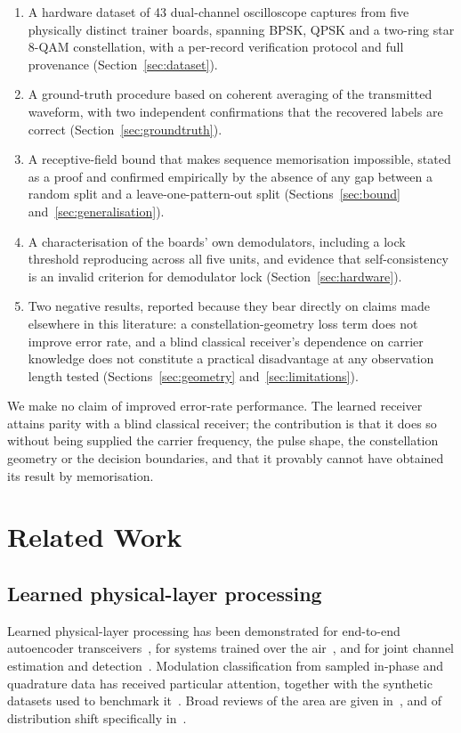 \documentclass[journal]{IEEEtran}   %
\begin{document}
\begin{enumerate}
\item A hardware dataset of 43 dual-channel oscilloscope captures from five
physically distinct trainer boards, spanning BPSK, QPSK and a two-ring star
8-QAM constellation, with a per-record verification protocol and full
provenance (Section~\ref{sec:dataset}).
\item A ground-truth procedure based on coherent averaging of the transmitted
waveform, with two independent confirmations that the recovered labels are
correct (Section~\ref{sec:groundtruth}).
\item A receptive-field bound that makes sequence memorisation impossible,
stated as a proof and confirmed empirically by the absence of any gap between a
random split and a leave-one-pattern-out split (Sections~\ref{sec:bound}
and~\ref{sec:generalisation}).
\item A characterisation of the boards' own demodulators, including a lock
threshold reproducing across all five units, and evidence that self-consistency
is an invalid criterion for demodulator lock (Section~\ref{sec:hardware}).
\item Two negative results, reported because they bear directly on claims made
elsewhere in this literature: a constellation-geometry loss term does not
improve error rate, and a blind classical receiver's dependence on carrier
knowledge does not constitute a practical disadvantage at any observation length
tested (Sections~\ref{sec:geometry} and~\ref{sec:limitations}).
\end{enumerate}

We make no claim of improved error-rate performance. The learned receiver
attains parity with a blind classical receiver; the contribution is that it does
so without being supplied the carrier frequency, the pulse shape, the
constellation geometry or the decision boundaries, and that it provably cannot
have obtained its result by memorisation.

\section{Related Work}
\label{sec:related}

\subsection{Learned physical-layer processing}
Learned physical-layer processing has been demonstrated for end-to-end
autoencoder transceivers~\cite{oshea2017intro}, for systems trained over the
air~\cite{dorner2018ota}, and for joint channel estimation and
detection~\cite{ye2018power}. Modulation classification from sampled in-phase
and quadrature data has received particular attention, together with the
synthetic datasets used to benchmark it~\cite{satyanarayan2023RML}. Broad
reviews of the area are given in~\cite{hoydis2021nativeAirInterface,
akroutMLPtoGPT, wangDlphysicalLayer}, and of distribution shift specifically
in~\cite{akrout2023domaingeneralization}.
\end{document}
